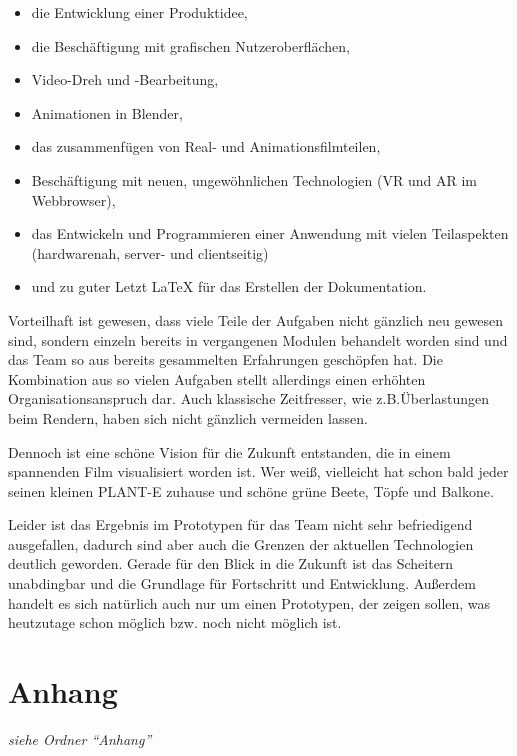 \begin{itemize}
\tightlist
\item
  die Entwicklung einer Produktidee,
\item
  die Beschäftigung mit grafischen Nutzeroberflächen,
\item
  Video-Dreh und -Bearbeitung,
\item
  Animationen in Blender,
\item
  das zusammenfügen von Real- und Animationsfilmteilen,
\item
  Beschäftigung mit neuen, ungewöhnlichen Technologien (VR und AR im
  Webbrowser),
\item
  das Entwickeln und Programmieren einer Anwendung mit vielen
  Teilaspekten (hardwarenah, server- und clientseitig)
\item
  und zu guter Letzt LaTeX für das Erstellen der Dokumentation.
\end{itemize}

Vorteilhaft ist gewesen, dass viele Teile der Aufgaben nicht gänzlich
neu gewesen sind, sondern einzeln bereits in vergangenen Modulen
behandelt worden sind und das Team so aus bereits gesammelten
Erfahrungen geschöpfen hat. Die Kombination aus so vielen Aufgaben
stellt allerdings einen erhöhten Organisationsanspruch dar. Auch
klassische Zeitfresser, wie z.B.Überlastungen beim Rendern, haben sich
nicht gänzlich vermeiden lassen.

Dennoch ist eine schöne Vision für die Zukunft entstanden, die in einem
spannenden Film visualisiert worden ist. Wer weiß, vielleicht hat schon
bald jeder seinen kleinen PLANT-E zuhause und schöne grüne Beete, Töpfe
und Balkone.

Leider ist das Ergebnis im Prototypen für das Team nicht sehr
befriedigend ausgefallen, dadurch sind aber auch die Grenzen der
aktuellen Technologien deutlich geworden. Gerade für den Blick in die
Zukunft ist das Scheitern unabdingbar und die Grundlage für Fortschritt
und Entwicklung. Außerdem handelt es sich natürlich auch nur um einen
Prototypen, der zeigen sollen, was heutzutage schon möglich bzw. noch
nicht möglich ist.

\hypertarget{anhang}{%
\section{Anhang}\label{anhang}}

\emph{siehe Ordner ``Anhang''}
